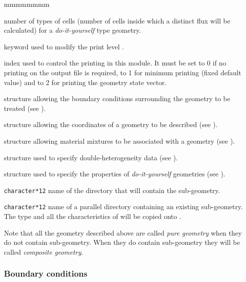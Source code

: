\begin{ListeDeDescription}{mmmmmmmm}
\item[\dusa{lp}] number of types of cells (number of cells inside which a distinct flux will be calculated) for a \textsl{do-it-yourself} type geometry.

\item[\moc{EDIT}] keyword used to modify the print level .

\item[\dusa{iprint}] index used to control the printing in this module.
It must be set to 0 if no printing on the output file is required, to 1 for
minimum printing (fixed default value) and to 2 for printing the geometry state
vector.

\item[\dstr{descBC}] structure allowing the boundary conditions surrounding
the geometry to be treated (see ).

\item[\dstr{descSP}] structure allowing the coordinates of a geometry to be
described (see ).

\item[\dstr{descPP}] structure allowing material mixtures to be associated
with a geometry (see ).

\item[\dstr{descDH}] structure used to specify double-heterogeneity data (see ).

\item[\dstr{descSIJ}] structure used to specify the properties of {\sl do-it-yourself}
geometries (see ).

\item[\dusa{SUBGEO}] {\tt character*12} name of the directory  that will
contain the sub-geometry.

\item[\dusa{OLDGEO}] {\tt character*12} name of a parallel directory
containing an existing sub-geometry. The type and all the characteristics of
 will be copied onto .

\end{ListeDeDescription}

Note that all the geometry described above are called {\sl pure geometry} when
they do not contain sub-geometry. When they do contain sub-geometry they will be
called {\sl composite geometry}. 

\goodbreak
\subsubsection{Boundary conditions}\label{sect:descBC}

